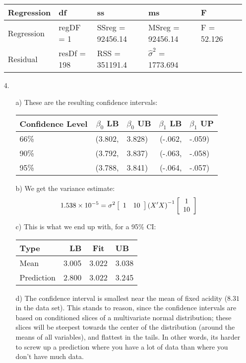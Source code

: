 \documentclass[11pt]{article}
\theoremstyle{definition}
\begin{document}
\begin{itemize}
        \begin{tabular}{l | l l l l l}
            Regression & df      & ss               & ms       & F     \\
            \hline
            Regression & regDF = 1       & SSreg = 92456.14 & MSreg = 92456.14          & F = 52.126 \\
            Residual   & resDf = 198     & RSS = 351191.4   & $\hat\sigma^2$ = 1773.694 &  
        \end{tabular}
    \item[4.]
        \begin{itemize}
            \item[a)] These are the resulting confidence intervals: \\
                \begin{tabular}{l | r l r l}
                    Confidence Level & $\beta_0$ LB & $\beta_0$ UB & $\beta_1$ LB & $\beta_1$ UP \\
                    \hline
                    66\%             &       (3.802,& 3.828)       &       (-.062,& -.059)     \\
                    90\%             &       (3.792,& 3.837)       &       (-.063,& -.058)     \\
                    95\%             &       (3.788,& 3.841)       &       (-.064,& -.057)
                \end{tabular}
            \item[b)] We get the variance estimate:
            \[1.538\times10^{-5} = \sigma^2 \left[ \begin{array}{c c} 1 & 10 \end{array} \right] \left(X'X\right)^{-1} \left[ \begin{array}{c} 1 \\  10 \end{array} \right] \]
            \item[c)] This is what we end up with, for a 95\% CI: \\
                \begin{tabular}{l | r c l}
                    Type       & LB    & Fit   & UB    \\
                    \hline
                    Mean       & 3.005 & 3.022 & 3.038 \\
                    Prediction & 2.800 & 3.022 & 3.245 
                \end{tabular}
            \item[d)]
                The confidence interval is smallest near the mean of fixed acidity ($8.31$ in the data set). This stands to reason, since the confidence intervals are based on conditioned slices of a multivariate normal distribution; these slices will be steepest towards the center of the distribution (around the means of all variables), and flattest in the tails. In other words, its harder to screw up a prediction where you have a lot of data than where you don't have much data. \\

\end{itemize}
\end{itemize}
\end{document}

